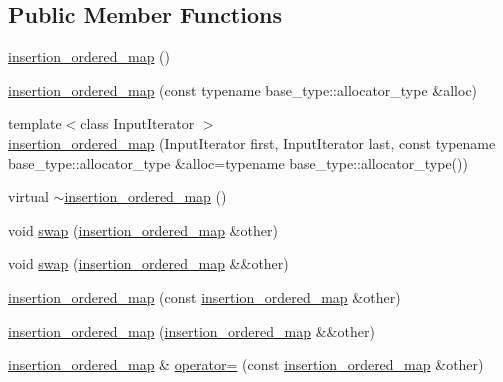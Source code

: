 \subsection*{Public Member Functions}
\begin{DoxyCompactItemize}
\item 
\hyperlink{classIceBRG_1_1insertion__ordered__map_a25ef7dfc57b16788fefef374b5bfbe0f}{insertion\+\_\+ordered\+\_\+map} ()
\item 
\hyperlink{classIceBRG_1_1insertion__ordered__map_a19d1c23882b2d97535279259b3e6a966}{insertion\+\_\+ordered\+\_\+map} (const typename base\+\_\+type\+::allocator\+\_\+type \&alloc)
\item 
{\footnotesize template$<$class Input\+Iterator $>$ }\\\hyperlink{classIceBRG_1_1insertion__ordered__map_a70fd49480c10d052ac533f8262cb2060}{insertion\+\_\+ordered\+\_\+map} (Input\+Iterator first, Input\+Iterator last, const typename base\+\_\+type\+::allocator\+\_\+type \&alloc=typename base\+\_\+type\+::allocator\+\_\+type())
\item 
virtual \hyperlink{classIceBRG_1_1insertion__ordered__map_a46dbf4c21c1448d57e172592aaa5f0af}{$\sim$insertion\+\_\+ordered\+\_\+map} ()
\item 
void \hyperlink{classIceBRG_1_1insertion__ordered__map_a44c1e51972b49c7702ef06c1bb37c442}{swap} (\hyperlink{classIceBRG_1_1insertion__ordered__map}{insertion\+\_\+ordered\+\_\+map} \&other)
\item 
void \hyperlink{classIceBRG_1_1insertion__ordered__map_ad315869cd423018e43329cb4055c896c}{swap} (\hyperlink{classIceBRG_1_1insertion__ordered__map}{insertion\+\_\+ordered\+\_\+map} \&\&other)
\item 
\hyperlink{classIceBRG_1_1insertion__ordered__map_a45ede697550fad83d89e1df6d7bc1203}{insertion\+\_\+ordered\+\_\+map} (const \hyperlink{classIceBRG_1_1insertion__ordered__map}{insertion\+\_\+ordered\+\_\+map} \&other)
\item 
\hyperlink{classIceBRG_1_1insertion__ordered__map_a1f8306d844d66c11bf6277405ac4f871}{insertion\+\_\+ordered\+\_\+map} (\hyperlink{classIceBRG_1_1insertion__ordered__map}{insertion\+\_\+ordered\+\_\+map} \&\&other)
\item 
\hyperlink{classIceBRG_1_1insertion__ordered__map}{insertion\+\_\+ordered\+\_\+map} \& \hyperlink{classIceBRG_1_1insertion__ordered__map_ae791b058e7ff4f1425be97b1bc62f3b9}{operator=} (const \hyperlink{classIceBRG_1_1insertion__ordered__map}{insertion\+\_\+ordered\+\_\+map} \&other)
\item 

\end{DoxyCompactItemize}
